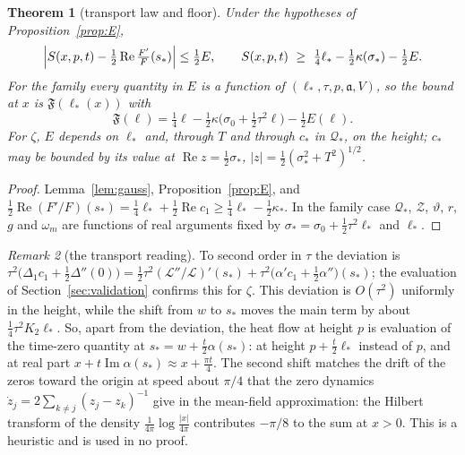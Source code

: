 \documentclass[11pt]{article}
\newtheorem{theorem}{Theorem}[section]
\theoremstyle{definition}
\theoremstyle{remark}
\newtheorem{remark}[theorem]{Remark}
\newcommand{\cL}{\mathcal L}
\newcommand{\fa}{\mathfrak a}
\newcommand{\re}{\operatorname{Re}}
\newcommand{\im}{\operatorname{Im}}
\numberwithin{equation}{section}
\begin{document}
\begin{theorem}[transport law and floor]\label{thm:transport}
Under the hypotheses of Proposition~\ref{prop:E},
\[
\Bigl\lvert S(x,p,t)-\tfrac12\re\tfrac{F'}F(s_*)\Bigr\rvert\le\tfrac12E,\qquad
S(x,p,t)\ \ge\ \tfrac14\ell_*-\tfrac12\kappa(\sigma_*)-\tfrac12E .
\]
For the family every quantity in $E$ is a function of
$(\ell_*,\tau,p,\fa,V)$, so the bound at $x$ is $\mathfrak F(\ell_*(x))$ with
\[
\mathfrak F(\ell)=\tfrac14\ell-\tfrac12\kappa\bigl(\sigma_0+\tfrac12\tau^2\ell\bigr)-\tfrac12E(\ell).
\]
For $\zeta$, $E$ depends on $\ell_*$ and, through $T$ and through $c_*$ in
$\mathcal Q_*$, on the height; $c_*$ may be bounded by its value at
$\re z=\frac12\sigma_*$, $\lvert z\rvert=\frac12(\sigma_*^2+T^2)^{1/2}$.
\end{theorem}

\begin{proof}
Lemma~\ref{lem:gauss}, Proposition~\ref{prop:E}, and
$\frac12\re(F'/F)(s_*)=\frac14\ell_*+\frac12\re c_1\ge\frac14\ell_*-\frac12\kappa_*$.
In the family case $\mathcal Q_*$, $\mathcal Z$, $\vartheta$, $r$, $g$ and
$\omega_m$ are functions of real arguments fixed by
$\sigma_*=\sigma_0+\frac12\tau^2\ell_*$ and $\ell_*$.
\end{proof}

\begin{remark}[the transport reading]\label{rem:reading}
To second order in $\tau$ the deviation is
$\tau^2\bigl(\Delta_1c_1+\frac12\Delta''(0)\bigr)=\frac12\tau^2(\cL''/\cL)'(s_*)+\tau^2\bigl(\alpha'c_1+\frac12\alpha''\bigr)(s_*)$;
the evaluation of Section~\ref{sec:validation} confirms this for $\zeta$.
This deviation is $O(\tau^2)$ uniformly in the height, while the shift from
$w$ to $s_*$ moves the main term by about $\frac14\tau^2K_2\ell_*$. So,
apart from the deviation, the heat flow at height $p$ is evaluation of the
time-zero quantity at $s_*=w+\frac t2\alpha(s_*)$: at height
$p+\frac t2\ell_*$ instead of $p$, and at real part
$x+t\im\alpha(s_*)\approx x+\frac{\pi t}4$. The second shift matches the
drift of the zeros toward the origin at speed about $\pi/4$ that the zero
dynamics $\dot z_j=2\sum_{k\ne j}(z_j-z_k)^{-1}$ give in the mean-field
approximation: the Hilbert transform of the density
$\frac1{4\pi}\log\frac{\lvert x\rvert}{4\pi}$ contributes $-\pi/8$ to the
sum at $x>0$. This is a heuristic and is used in no proof.
\end{remark}
\end{document}
